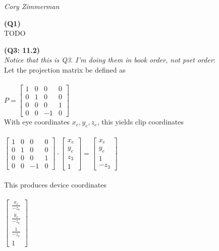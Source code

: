 \documentclass[letterpaper, 11pt]{article}
\begin{document}
\noindent \textit{Cory Zimmerman}
\medskip

\noindent \textbf{(Q1)} \\ 
TODO

\medskip
\textbf{(Q3: 11.2)} \\ 
\textit{Notice that this is Q3. I'm doing them in book order, not pset order}: \\
Let the projection matrix be defined as \\ \\ 
$P = \begin{bmatrix}
1 & 0 & 0 & 0 \\
0 & 1 & 0 & 0 \\
0 & 0 & 0 & 1 \\
0 & 0 & -1 & 0
\end{bmatrix}$ \\

With eye coordinates $x_e, y_e, z_e$, this yields clip coordinates \\ \\ 
$\begin{bmatrix}
1 & 0 & 0 & 0 \\
0 & 1 & 0 & 0 \\
0 & 0 & 0 & 1 \\
0 & 0 & -1 & 0
\end{bmatrix} 
\cdot 
\begin{bmatrix}
x_e  \\
y_e  \\
z_3  \\
1 
\end{bmatrix}
=
\begin{bmatrix}
x_e  \\
y_e  \\
1 \\
-z_3
\end{bmatrix}$ \\ \\ 

This produces device coordinates \\ \\ 
$\begin{bmatrix}
\frac{x_e}{-z_e}  \\
\frac{y_e}{-z_e}  \\
\frac{1}{-z_e} \\
1
\end{bmatrix}$ \\ \\ 
\end{document}
